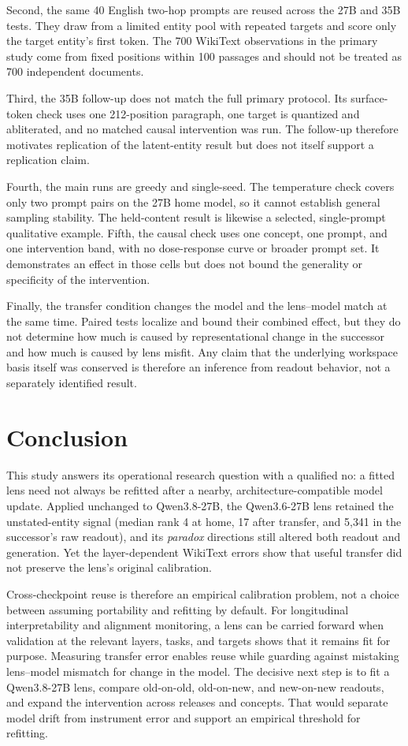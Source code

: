 \documentclass[10pt,a4paper,twocolumn]{article}
\begin{document}
Second, the same 40 English two-hop prompts are reused across the 27B and 35B
tests. They draw from a limited entity pool with repeated targets and score
only the target entity's first token. The 700 WikiText observations in the
primary study come from fixed positions within 100 passages and should not be
treated as 700 independent documents.

Third, the 35B follow-up does not match the full primary protocol. Its
surface-token check uses one 212-position paragraph, one target is quantized
and abliterated, and no matched causal intervention was run. The follow-up
therefore motivates replication of the latent-entity result but does not
itself support a replication claim.

Fourth, the main runs are greedy and single-seed. The temperature check
covers only two prompt pairs on the 27B home model, so it cannot establish
general sampling stability. The held-content result is likewise a selected,
single-prompt qualitative example. Fifth, the causal check uses one concept,
one prompt, and one intervention band, with no dose-response curve or broader
prompt set. It demonstrates an effect in those cells but does not bound the
generality or specificity of the intervention.

Finally, the transfer condition changes the model and the lens--model match at
the same time. Paired tests localize and bound their combined effect, but they
do not determine how much is caused by representational change in the
successor and how much is caused by lens misfit. Any claim that the underlying
workspace basis itself was conserved is therefore an inference from readout
behavior, not a separately identified result.

\section{Conclusion}

This study answers its operational research question with a qualified no: a
fitted lens need not always be refitted after a nearby,
architecture-compatible model update. Applied unchanged to Qwen3.8-27B, the
Qwen3.6-27B lens retained the unstated-entity signal (median rank 4 at home, 17
after transfer, and 5{,}341 in the successor's raw readout), and its
\emph{paradox} directions still altered both readout and generation. Yet the
layer-dependent WikiText errors show that useful transfer did not preserve
the lens's original calibration.

Cross-checkpoint reuse is therefore an empirical calibration problem, not a
choice between assuming portability and refitting by default. For longitudinal
interpretability and alignment monitoring, a lens can be carried forward when
validation at the relevant layers, tasks, and targets shows that it remains
fit for purpose. Measuring transfer error enables reuse while guarding against
mistaking lens--model mismatch for change in the model. The decisive next step is to fit a Qwen3.8-27B lens, compare old-on-old, old-on-new, and new-on-new readouts, and expand the intervention across releases and concepts. That would separate model drift from instrument error and support an empirical threshold for refitting.
\end{document}
